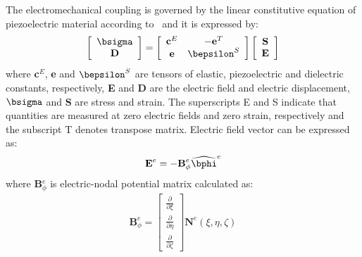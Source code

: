 \documentclass[a4paper,12pt]{article}
\begin{document}
The electromechanical coupling is governed by the linear constitutive equation 
of piezoelectric material according to~\cite{giurgiutiumicromechatronics} and 
it is expressed by:
\begin{eqnarray}
\left [ 
\begin {array}{c}
\bsigma\\
\textbf{D}
 \end{array}\right ]=
\left [ 
\begin{array}{cc}
\textbf{c}^E & -\textbf{e}^T \\
\textbf{e} & \bepsilon^S 
\end{array} \right ]
\left[ 
\begin{array}{c}
\textbf{S}\\
\textbf{E} 
\end{array} \right ]
\end{eqnarray}
where \textbf{c}$^E$, \textbf{e} and $\bepsilon^S$ are tensors of elastic, 
piezoelectric and dielectric constants, respectively, \textbf{E} and \textbf{D} 
are the electric field and electric displacement, $\bsigma$ and \textbf{S} are 
stress and strain.
The superscripts E and S indicate that quantities are measured at zero electric 
fields and zero strain, respectively and the subscript T denotes transpose 
matrix.
Electric field vector can be expressed as:
\begin{eqnarray}
\textbf{E}^e=-\textbf{B}_\phi^e \widehat{\bphi}^e
\end{eqnarray}
where \textbf{B}$_\phi^e$ is electric-nodal potential matrix calculated as:
\begin{eqnarray}
\textbf{B}_\phi^e=
\left[ \begin{array}{c}
\frac{\partial }{\partial \xi}\\
\frac{\partial }{\partial \eta}\\
\frac{\partial }{\partial \zeta}
\end{array} \right]\textbf{N}^e(\xi,\eta,\zeta)
\end{eqnarray}
\end{document}
